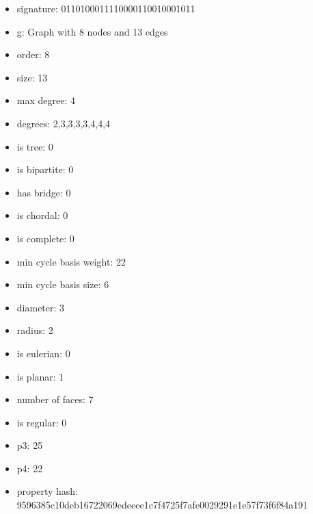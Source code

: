 \begin{itemize}
\item signature: 0110100011110000110010001011
\item g: Graph with 8 nodes and 13 edges
\item order: 8
\item size: 13
\item max degree: 4
\item degrees: 2,3,3,3,3,4,4,4
\item is tree: 0
\item is bipartite: 0
\item has bridge: 0
\item is chordal: 0
\item is complete: 0
\item min cycle basis weight: 22
\item min cycle basis size: 6
\item diameter: 3
\item radius: 2
\item is eulerian: 0
\item is planar: 1
\item number of faces: 7
\item is regular: 0
\item p3: 25
\item p4: 22
\item property hash: 9596385c10deb16722069edeeee1c7f4725f7afe0029291e1e57f73f6f84a191
\end{itemize}
\newpage
\begin{figure}
\end{figure}
